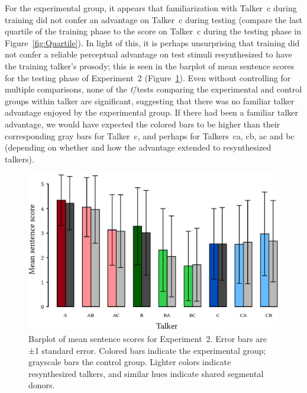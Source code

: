 For the experimental group, it appears that familiarization with Talker~\ac{c} during training did not confer an advantage on Talker~\ac{c} during testing (compare the last quartile of the training phase to the score on Talker~\ac{c} during the testing phase in Figure~\ref{fig:Quartile}).  %
In light of this, it is perhaps unsurprising that training did not confer a reliable perceptual advantage on test stimuli resynthesized to have the training talker’s prosody; this is seen in the barplot of mean sentence scores for the testing phase of Experiment~2 (Figure~\ref{fig:ExpTwoBarplot}).  Even without controlling for multiple comparisons, none of the \textit{t}\=/tests comparing the experimental and control groups within talker are significant, suggesting that there was no familiar talker advantage enjoyed by the experimental group.  If there had been a familiar talker advantage, we would have expected the colored bars to be higher than their corresponding gray bars for Talker~\ac{c}, and perhaps for Talkers~\ac{ca}, \ac{cb}, \ac{ac} and \ac{bc} (depending on whether and how the advantage extended to resynthesized talkers).

\begin{figure}[bt]
	\begin{centering}
	\includegraphics{figures/results/ExpTwoBarplot.eps}
	\caption[Barplot of mean sentence scores for Experiment~2]{Barplot of mean sentence scores for Experiment~2.  Error bars are ±1 standard error.  Colored bars indicate the experimental group; grayscale bars the control group.  Lighter colors indicate resynthesized talkers, and similar hues indicate shared segmental donors.\label{fig:ExpTwoBarplot}}
	\end{centering}
\end{figure}

